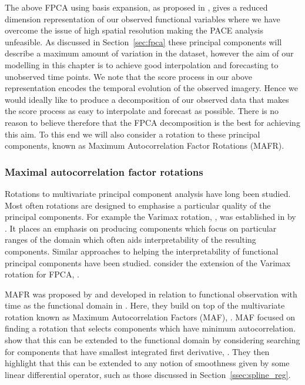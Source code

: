 The above FPCA using basis expansion, as proposed in \citep[Chapter~8]{ramsay_functional_2010}, gives a reduced dimension representation of our observed functional variables where we have overcome the issue of high spatial resolution making the PACE analysis unfeasible.
As discussed in Section~\ref{sec:fpca} these principal components will describe a maximum amount of variation in the dataset, however the aim of our modelling in this chapter is to achieve good interpolation and forecasting to unobserved time points.
We note that the score process in our above representation encodes the temporal evolution of the observed imagery. 
Hence we would ideally like to produce a decomposition of our observed data that makes the score process as easy to interpolate and forecast as possible. 
There is no reason to believe therefore that the FPCA decomposition is the best for achieving this aim.
To this end we will also consider a rotation to these principal components, known as Maximum Autocorrelation Factor Rotations (MAFR).

\subsubsection{Maximal autocorrelation factor rotations \label{ssec:mafr}}
Rotations to multivariate principal component analysis have long been studied.
Most often rotations are designed to emphasise a particular quality of the principal components. 
For example the Varimax rotation, \citep{kaiser_varimax_1958}, was established in \citeyear{kaiser_varimax_1958} by \citeauthor{kaiser_varimax_1958}.
It places an emphasis on producing components which focus on particular ranges of the domain which often aids interpretability of the resulting components.
Similar approaches to helping the interpretability of functional principal components have been studied.
\citeauthor{ramsay_functional_2010} consider the extension of the Varimax rotation for FPCA, \citep{ramsay_functional_2010}. 

MAFR was proposed by \citeauthor{hooker_maximal_2015} and developed in relation to functional observation with time as the functional domain in \citep{hooker_maximal_2016}.
Here, they build on top of the multivariate rotation known as Maximum Autocorrelation Factors (MAF), \citep{switzer_minmax_1984}.
MAF focused on finding a rotation that selects components which have minimum autocorrelation. 
\citeauthor{hooker_maximal_2016} show that this can be extended to the functional domain by considering searching for components that have smallest integrated first derivative, \citep{hooker_maximal_2016}. 
They then highlight that this can be extended to any notion of smoothness given by some linear differential operator, such as those discussed in Section~\ref{ssec:spline_reg}. 

